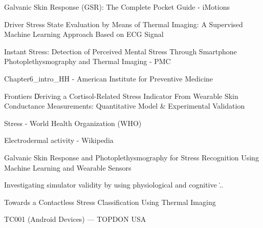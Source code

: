 Galvanic Skin Response (GSR): The Complete Pocket Guide - iMotions


Driver Stress State Evaluation by Means of Thermal Imaging: A Supervised
Machine Learning Approach Based on ECG Signal


Instant Stress: Detection of Perceived Mental Stress Through Smartphone
Photoplethysmography and Thermal Imaging - PMC


Chapter6_intro_HH - American Institute for Preventive Medicine


Frontiers \| Deriving a Cortisol-Related Stress Indicator From Wearable
Skin Conductance Measurements: Quantitative Model & Experimental
Validation


Stress - World Health Organization (WHO)


Electrodermal activity - Wikipedia


Galvanic Skin Response and Photoplethysmography for Stress Recognition
Using Machine Learning and Wearable Sensors


Investigating simulator validity by using physiological and cognitive
\...


Towards a Contactless Stress Classification Using Thermal Imaging


TC001 (Android Devices) --- TOPDON USA
